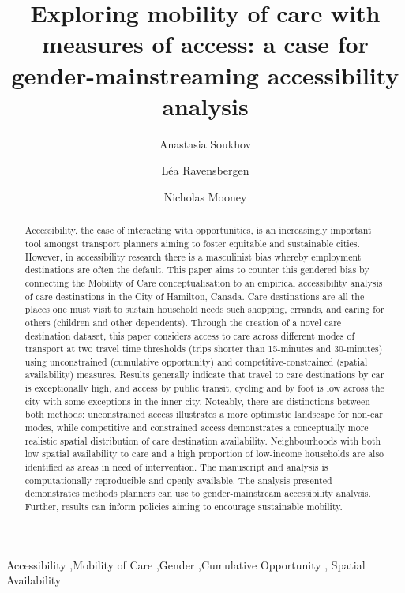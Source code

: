 \documentclass[
  authoryear,
  preprint,
  3p]{elsarticle}
\begin{document}
\begin{frontmatter}
\title{Exploring mobility of care with measures of access: a case for
gender-mainstreaming accessibility analysis}
\author[1]{Anastasia Soukhov%
%
}
\author[1]{Léa Ravensbergen%
%
}
\author[1]{Nicholas Mooney%
%
}





        
\begin{abstract}
Accessibility, the ease of interacting with opportunities, is an
increasingly important tool amongst transport planners aiming to foster
equitable and sustainable cities. However, in accessibility research
there is a masculinist bias whereby employment destinations are often
the default. This paper aims to counter this gendered bias by connecting
the Mobility of Care conceptualisation to an empirical accessibility
analysis of care destinations in the City of Hamilton, Canada. Care
destinations are all the places one must visit to sustain household
needs such shopping, errands, and caring for others (children and other
dependents). Through the creation of a novel care destination dataset,
this paper considers access to care across different modes of transport
at two travel time thresholds (trips shorter than 15-minutes and
30-minutes) using unconstrained (cumulative opportunity) and
competitive-constrained (spatial availability) measures. Results
generally indicate that travel to care destinations by car is
exceptionally high, and access by public transit, cycling and by foot is
low across the city with some exceptions in the inner city. Noteably,
there are distinctions between both methods: unconstrained access
illustrates a more optimistic landscape for non-car modes, while
competitive and constrained access demonstrates a conceptually more
realistic spatial distribution of care destination availability.
Neighbourhoods with both low spatial availability to care and a high
proportion of low-income households are also identified as areas in need
of intervention. The manuscript and analysis is computationally
reproducible and openly available. The analysis presented demonstrates
methods planners can use to gender-mainstream accessibility analysis.
Further, results can inform policies aiming to encourage sustainable
mobility.
\end{abstract}





\begin{keyword}
    Accessibility \sep Mobility of Care \sep Gender \sep Cumulative
Opportunity \sep 
    Spatial Availability
\end{keyword}
\end{frontmatter}
\end{document}
